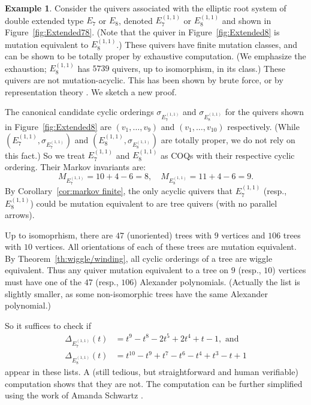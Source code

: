 \documentclass[11pt, letterpaper]{amsart}
\theoremstyle{definition}
\newtheorem{example}[theorem]{Example}
\numberwithin{equation}{section}
\begin{document}
\begin{example}
\label{eg:extended not acyclic}
Consider the quivers associated with the elliptic root system of double extended type $E_7$ or $E_8$, denoted $E_7^{(1,1)}$ or $E_8^{(1,1)}$ and shown in Figure~\ref{fig:Extended78}. 
(Note that the quiver in Figure~\ref{fig:Extended8} is mutation equivalent to $E_8^{(1,1)}$.)
These quivers have finite mutation classes, and can be shown to be totally proper by exhaustive computation. 
(We emphasize the exhaustion; $E_8^{(1,1)}$ has $5739$ quivers, up to isomorphism, in its class.)
These quivers are not mutation-acyclic.
This has been shown by brute force, or by representation theory \cite[Section 2.3]{KellerE8}.
We sketch a new proof.

The canonical candidate cyclic orderings $\sigma_{E_7^{(1,1)}}$ and $\sigma_{E_8^{(1,1)}}$ for the quivers shown in Figure~\ref{fig:Extended8} are $(v_1, \ldots, v_9)$ and $(v_1, \ldots, v_{10})$ respectively. 
(While $(E_7^{(1,1)}, \sigma_{E_7^{(1,1)}})$ and $(E_8^{(1,1)}, \sigma_{E_8^{(1,1)}})$ are totally proper, we do not rely on this fact.)
So we treat $E_7^{(1,1)}$ and $E_8^{(1,1)}$ as COQs with their respective cyclic ordering.
Their Markov invariants are:
$$M_{E_7^{(1,1)}} = 10 + 4 - 6 = 8,\quad M_{E_8^{(1,1)}} = 11 + 4 - 6 = 9.$$
By Corollary~\ref{cor:markov finite}, the only acyclic quivers that $E_7^{(1,1)}$ (resp., $E_8^{(1,1)}$) could be mutation equivalent to are tree quivers (with no parallel arrows).

Up to isomoprhism, there are $47$ (unoriented) trees with $9$ vertices and $106$ trees with $10$ vertices. 
All orientations of each of these trees are mutation equivalent.
By Theorem~\ref{th:wiggle/winding}, all cyclic orderings of a tree are wiggle equivalent.
Thus any quiver mutation equivalent to a tree on $9$ (resp., $10$) vertices must have one of the $47$ (resp., $106$) Alexander polynomials. (Actually the list is slightly smaller, as some non-isomorphic trees have the same Alexander polynomial.)

So it suffices to check if 
\begin{align*}
\Delta_{E_7^{(1,1)}}(t) &= t^9 - t^8 - 2t^5 + 2 t^4 + t - 1, \text{ and} \\
\Delta_{E_8^{(1,1)}}(t) &= t^{10} - t^9 + t^7 - t^6 - t^4 + t^3 - t + 1 
\end{align*}
appear in these lists.
A (still tedious, but straightforward and human verifiable) computation shows that they are not.
The computation can be further simplified using the work of Amanda Schwartz \cite{SchwartzTree}.
\end{example}
\end{document}
